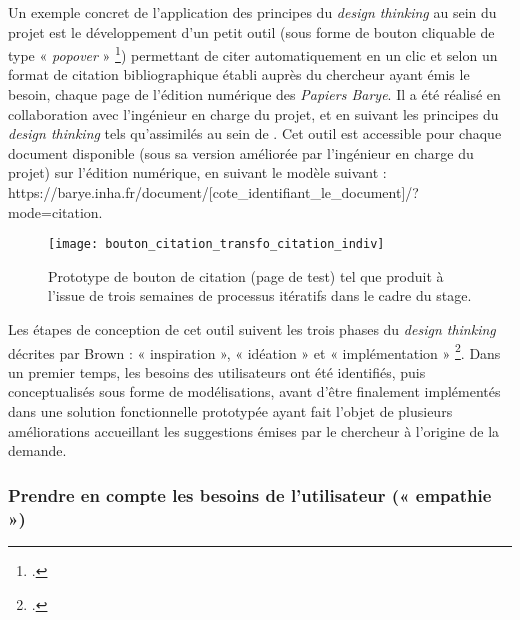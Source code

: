 Un exemple concret de l'application des principes du \textit{design thinking} au sein du projet \pense est le développement d’un petit outil (sous forme de bouton cliquable de type « \textit{popover} » \footcite{otto_popovers_nodate}) permettant de citer automatiquement en un clic et selon un format de citation bibliographique établi auprès du chercheur ayant émis le besoin, chaque page de l’édition numérique des \textit{Papiers Barye}. Il a été réalisé en collaboration avec l’ingénieur en charge du projet, et en suivant les principes du \textit{design thinking} tels qu’assimilés au sein de \pense. Cet outil est accessible pour chaque document disponible (sous sa version améliorée par l’ingénieur en charge du projet) sur l’édition numérique, en suivant le modèle suivant : https://barye.inha.fr/document/[cote\_identifiant\_le\_document]/?mode=citation. 

\begin{figure}[h] 
\centering 
\texttt{[image: bouton\_citation\_transfo\_citation\_indiv]} 
\caption{Prototype de bouton de citation (page de test) tel que produit à l’issue de trois semaines de processus itératifs dans le cadre du stage.} 
\label{fig:prototype-bouton} 
\end{figure}

Les étapes de conception de cet outil suivent les trois phases du \textit{design thinking} décrites par Brown : « inspiration », « idéation » et « implémentation » \footcite[p.5]{brown_design_2008}. Dans un premier temps, les besoins des utilisateurs ont été identifiés, puis conceptualisés sous forme de modélisations, avant d’être finalement implémentés dans une solution fonctionnelle prototypée ayant fait l’objet de plusieurs améliorations accueillant les suggestions émises par le chercheur à l’origine de la demande. 

\subsubsection{Prendre en compte les besoins de l’utilisateur (« empathie »)}

